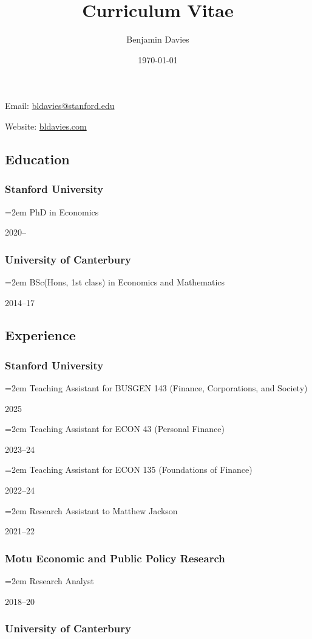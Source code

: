 \documentclass[11pt,oneside]{memoir}
\title{Curriculum Vitae}
\author{Benjamin Davies}
\date{\today}
\newcommand{\entry}[2]{\par\parbox[t]{0.9\linewidth}{\strut\raggedright\hangindent=2em #2\strut}\hfill#1}
\begin{document}
	\chapter{\theauthor}
	
		Email: \href{mailto:bldavies@stanford.edu}{bldavies@stanford.edu}
	
		Website: \href{https://bldavies.com}{bldavies.com}
	
	\section{Education}
	
	\subsection{Stanford University}
	
		\entry{2020--}{PhD in Economics}
	
	\subsection{University of Canterbury}
	
		\entry{2014--17}{BSc(Hons, 1st class) in Economics and Mathematics}
	
	\section{Experience}
	
	\subsection{Stanford University}
	
		\entry{2025}{Teaching Assistant for BUSGEN 143 (Finance, Corporations, and Society)}
		\entry{2023--24}{Teaching Assistant for ECON 43 (Personal Finance)}
		\entry{2022--24}{Teaching Assistant for ECON 135 (Foundations of Finance)}
		\entry{2021--22}{Research Assistant to Matthew Jackson}
	
	\subsection{Motu Economic and Public Policy Research}
	
		\entry{2018--20}{Research Analyst}
	
	\subsection{University of Canterbury}
	
\end{document}
